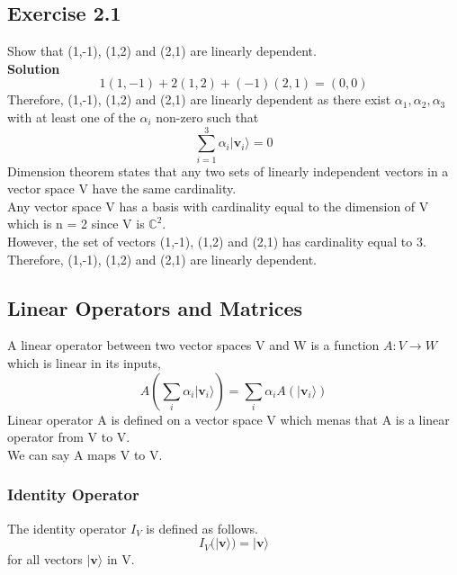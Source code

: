 \documentclass{article}
\begin{document}
\subsection{Exercise 2.1}
Show that (1,-1), (1,2) and (2,1) are linearly dependent. \\
\textbf{Solution} \\
\begin{equation}
    1(1,-1) + 2(1,2) + (-1)(2,1) = (0,0)
\end{equation}
Therefore, (1,-1), (1,2) and (2,1) are linearly dependent as there exist $\alpha_1, \alpha_2, \alpha_3$ with at least one of the $\alpha_i$ non-zero such that 
\begin{equation}
    \sum_{i=1}^3 \alpha_i |\mathbf{v}_i\rangle = 0
\end{equation}
Dimension theorem states that any two sets of linearly independent vectors in a vector space V have the same cardinality. \\
Any vector space V has a basis with cardinality equal to the dimension of V which is n = 2 since V is $\mathbb{C}^2$. \\
However, the set of vectors (1,-1), (1,2) and (2,1) has cardinality equal to 3. \\
Therefore, (1,-1), (1,2) and (2,1) are linearly dependent. \\
\subsection{Linear Operators and Matrices}
A linear operator between two vector spaces V and W is a function $A: V \rightarrow W$ which is linear in its inputs, \\
\begin{equation}
    A(\sum_i \alpha_i |\mathbf{v}_i\rangle) = \sum_i \alpha_i A(|\mathbf{v}_i\rangle)
\end{equation}
Linear operator A is defined on a vector space V which menas that A is a linear operator from V to V. \\
We can say A maps V to V. \\
\subsubsection{Identity Operator}
The identity operator $I_V$ is defined as follows. \\
\begin{equation}
    I_V(|\mathbf{v}\rangle) = |\mathbf{v}\rangle
\end{equation} for all vectors $|\mathbf{v}\rangle$ in V. \\
\end{document}
